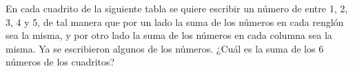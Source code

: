 En cada cuadrito de la siguiente tabla se quiere escribir un número de entre 1, 2, 3, 4 y 5, de tal manera que por un lado la suma de los números en cada renglón sea la misma, y por otro lado la suma de los números en cada columna sea la misma. Ya se escribieron algunos de los números. ¿Cuál es la suma de los 6 números de los cuadritos?